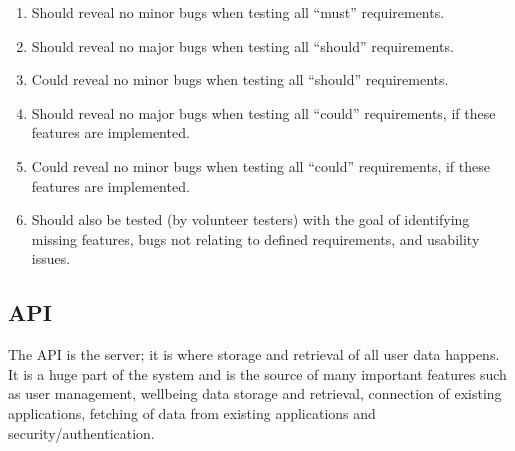 \documentclass[11pt,openright,a4paper]{report}
\begin{document}
\begin{enumerate}
\begin{enumerate}
  \item Should reveal no minor bugs when testing all \enquote{must} requirements.
  \item Should reveal no major bugs when testing all \enquote{should} requirements.
  \item Could reveal no minor bugs when testing all \enquote{should} requirements.
  \item Should reveal no major bugs when testing all \enquote{could} requirements, if these features are implemented.
  \item Could reveal no minor bugs when testing all \enquote{could} requirements, if these features are implemented.
  \item Should also be tested (by volunteer testers) with the goal of identifying missing features, bugs not relating to defined requirements, and usability issues.
  \end{enumerate}
\end{enumerate}

\subsection{API} \label{subsec:apireqs}
The API is the server; it is where storage and retrieval of all user data happens. It is a huge part of the system and is the source of many important features such as user management, wellbeing data storage and retrieval, connection of existing applications, fetching of data from existing applications and security/authentication.
\end{document}
